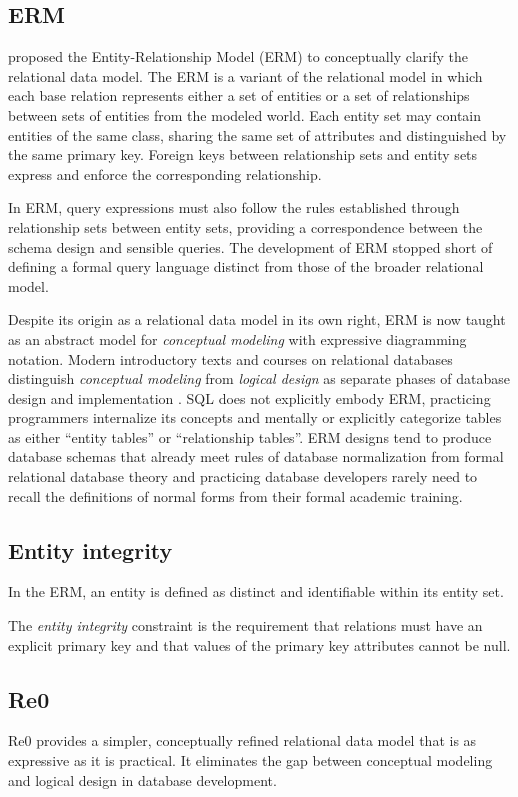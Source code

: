 \documentclass[letter,10pt]{article}
\begin{document}
\subsection{ERM}
\cite{chen_entity_1976} proposed the Entity-Relationship Model (ERM) to conceptually clarify the relational data model.
The ERM is a variant of the relational model in which each base relation represents either a set of entities or a set of relationships between sets of entities from the modeled world. 
Each entity set may contain entities of the same class, sharing the same set of attributes and distinguished by the same  primary key.
Foreign keys between relationship sets and entity sets express and enforce the corresponding relationship.

In ERM, query expressions must also follow the rules established through relationship sets between entity sets, providing a correspondence between the schema design and sensible queries. 
The development of ERM stopped short of defining a formal query language distinct from those of the broader relational model.

Despite its origin as a relational data model in its own right, ERM is now taught as an abstract model for \emph{conceptual modeling} with expressive diagramming notation.  
Modern introductory texts and courses on relational databases distinguish \emph{conceptual modeling} from \emph{logical design} as separate phases of database design and implementation \citep{elmasri-2015-fundamentals, coronel-2016-database}.
SQL does not explicitly embody ERM, practicing programmers internalize its concepts and  mentally or explicitly categorize tables as either ``entity tables'' or ``relationship tables''.  
ERM designs tend to produce database schemas that already  meet rules of database normalization from formal relational database theory and practicing database developers rarely need to recall the definitions of normal forms from their formal academic training.

\subsection{Entity integrity}
In the ERM, an entity is defined as distinct and identifiable within its entity set. 

The \emph{entity integrity} constraint is the requirement that relations must have an explicit primary key and that values of the primary key attributes cannot be null. 

\subsection{Re0}
Re0 provides a simpler, conceptually refined relational data model that is as expressive as it is practical. 
It eliminates the gap between conceptual modeling and logical design in database development.
\end{document}
